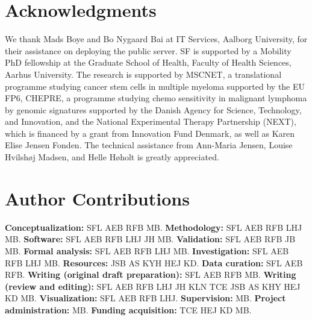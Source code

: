\documentclass[10pt,letterpaper]{article}
\begin{document}
\section*{Acknowledgments}
We thank Mads Boye and Bo Nygaard Bai at IT Services, Aalborg University, for their assistance on deploying the public server.
SF is supported by a Mobility PhD fellowship at the Graduate School of Health, Faculty of Health Sciences, Aarhus University.
The research is supported by MSCNET, a translational programme studying cancer stem cells in multiple myeloma supported by the EU FP6, CHEPRE, a programme studying chemo sensitivity in malignant lymphoma by genomic signatures supported by the Danish Agency for Science, Technology, and Innovation, and the National Experimental Therapy Partnership (NEXT), which is financed by a grant from Innovation Fund Denmark, as well as Karen Elise Jensen Fonden.
The technical assistance from Ann-Maria Jensen, Louise Hvilsh{\o}j Madsen, and Helle H{\o}holt is greatly appreciated.

\section*{Author Contributions}
{\bf Conceptualization:} SFL AEB RFB MB.
{\bf Methodology:} SFL AEB RFB LHJ MB.
{\bf Software:} SFL AEB RFB LHJ JH MB.
{\bf Validation:} SFL AEB RFB JB MB.
{\bf Formal analysis:} SFL AEB RFB LHJ MB.
{\bf Investigation:} SFL AEB RFB LHJ MB.
{\bf Resources:} JSB AS KYH HEJ KD.
{\bf Data curation:} SFL AEB RFB.
{\bf Writing (original draft preparation):} SFL AEB RFB MB.
{\bf Writing (review and editing):} SFL AEB RFB LHJ JH KLN TCE JSB AS KHY HEJ KD MB.
{\bf Visualization:} SFL AEB RFB LHJ.
{\bf Supervision:} MB.
{\bf Project administration:} MB.
{\bf Funding acquisition:} TCE HEJ KD MB.
\end{document}

